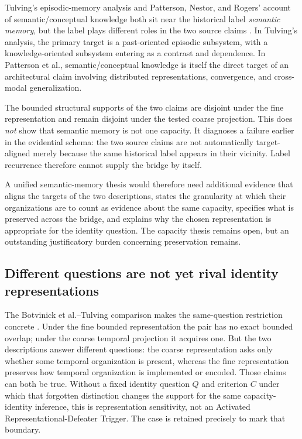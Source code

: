 \documentclass[11pt]{article}
\begin{document}
Tulving's episodic-memory analysis and Patterson, Nestor, and Rogers' account of semantic/conceptual knowledge both sit near the historical label \emph{semantic memory}, but the label plays different roles in the two source claims \citep{Tulving2002EpisodicMemory,PattersonNestorRogers2007Semantic}. In Tulving's analysis, the primary target is a past-oriented episodic subsystem, with a knowledge-oriented subsystem entering as a contrast and dependence. In Patterson et al., semantic/conceptual knowledge is itself the direct target of an architectural claim involving distributed representations, convergence, and cross-modal generalization.

The bounded structural supports of the two claims are disjoint under the fine representation and remain disjoint under the tested coarse projection. This does \emph{not} show that semantic memory is not one capacity. It diagnoses a failure earlier in the evidential schema: the two source claims are not automatically target-aligned merely because the same historical label appears in their vicinity. Label recurrence therefore cannot supply the bridge by itself.

A unified semantic-memory thesis would therefore need additional evidence that aligns the targets of the two descriptions, states the granularity at which their organizations are to count as evidence about the same capacity, specifies what is preserved across the bridge, and explains why the chosen representation is appropriate for the identity question. The capacity thesis remains open, but an outstanding justificatory burden concerning preservation remains.

\subsection{Different questions are not yet rival identity representations}

The Botvinick et al.--Tulving comparison makes the same-question restriction concrete \citep{BotvinickEtAl2001ConflictMonitoring,Tulving2002EpisodicMemory}. Under the fine bounded representation the pair has no exact bounded overlap; under the coarse temporal projection it acquires one. But the two descriptions answer different questions: the coarse representation asks only whether some temporal organization is present, whereas the fine representation preserves how temporal organization is implemented or encoded. Those claims can both be true. Without a fixed identity question \(Q\) and criterion \(C\) under which that forgotten distinction changes the support for the same capacity-identity inference, this is representation sensitivity, not an Activated Representational-Defeater Trigger. The case is retained precisely to mark that boundary.
\end{document}
